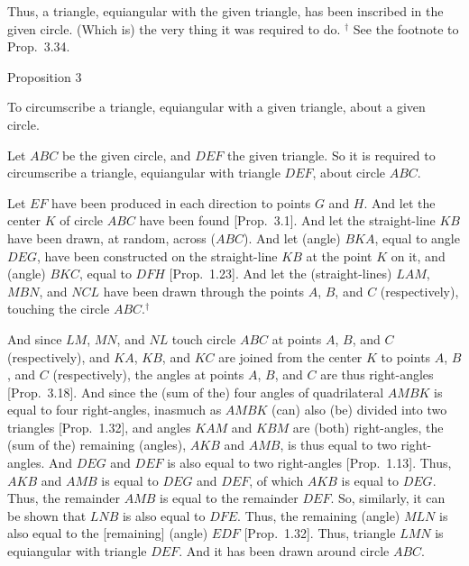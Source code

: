  Thus, a triangle, equiangular with the given triangle, has been inscribed in
 the given circle. (Which is) the very thing it was required to do.
{\footnotesize \noindent$^\dag$ See the footnote
to Prop.~3.34.}


\begin{center}
{\large Proposition 3}
\end{center}

To circumscribe a triangle, equiangular with a given triangle, about a given
circle.

\epsfysize=1.8in
\centerline{}

Let $ABC$ be the given circle, and $DEF$ the given triangle. So it is required
to circumscribe a triangle, equiangular with triangle  $DEF$, about circle $ABC$.

Let $EF$ have been produced in each direction to points $G$ and 
$H$. And
let the center $K$ of circle $ABC$ have been found [Prop.~3.1].
And let the straight-line $KB$ have been drawn, at random,  across ($ABC$).
And let (angle) $BKA$, equal to angle $DEG$, have been constructed on the straight-line $KB$ at the point $K$ on it, and (angle) $BKC$, equal to
$DFH$ [Prop.~1.23]. And let the (straight-lines) $LAM$, $MBN$, and $NCL$ have been 
drawn through the points $A$, $B$, and $C$ (respectively), touching the circle $ABC$.$^\dag$

And since $LM$, $MN$, and $NL$ touch circle $ABC$ at points $A$, $B$, and $C$
(respectively), and $KA$, $KB$, and $KC$ are joined from the center $K$
to  points $A$, $B$, and $C$ (respectively), the angles at points
$A$, $B$, and $C$ are thus right-angles [Prop.~3.18]. And
since the (sum of the) four angles of quadrilateral $AMBK$ is equal to
four right-angles,
inasmuch as $AMBK$ (can) also (be) divided into two triangles [Prop.~1.32],
and angles $KAM$ and $KBM$ are (both) right-angles, the (sum of the) remaining (angles), $AKB$ and $AMB$, is thus equal to two right-angles. 
And $DEG$ and $DEF$ is also equal to two right-angles [Prop.~1.13].
Thus, $AKB$ and $AMB$ is equal to $DEG$ and $DEF$, of which $AKB$ is
equal to $DEG$. Thus, the remainder $AMB$ is equal to the remainder $DEF$.
So, similarly, it can be shown that $LNB$ is also equal to $DFE$. Thus, the
remaining (angle) $MLN$ is also equal to the [remaining] (angle) $EDF$ [Prop.~1.32]. Thus,
triangle $LMN$ is equiangular with triangle $DEF$. And it has been drawn around
circle $ABC$.

